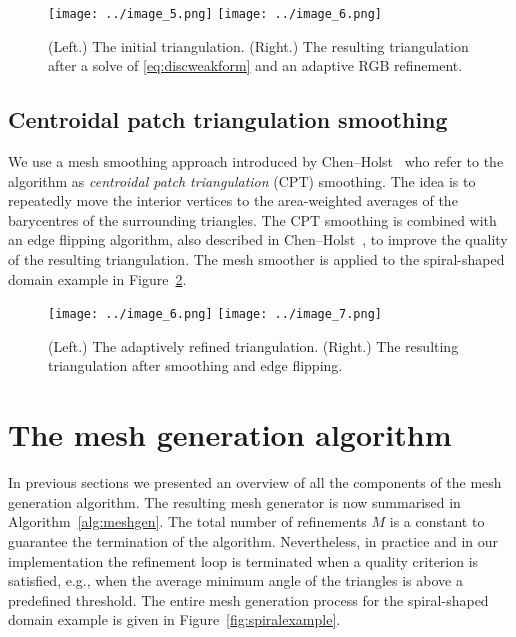 \documentclass[12pt]{rmstyle}
\begin{document}
\begin{figure}[htbp]
\centering
\texttt{[image: ../image\_5.png]}
\texttt{[image: ../image\_6.png]}
\caption{(Left.) The initial triangulation. (Right.) The resulting triangulation
  after a solve of \eqref{eq:discweakform} and an adaptive RGB refinement.}
\label{fig:firstrgb}
\end{figure}

\subsection{Centroidal patch triangulation smoothing}
\label{sec:cpt}

We use a mesh smoothing approach introduced by Chen--Holst~\cite{Chen_2011} who
refer to the algorithm as \emph{centroidal patch triangulation} (CPT) smoothing.
The idea is to repeatedly move the interior vertices to the area-weighted
averages of the barycentres of the surrounding triangles.  The CPT smoothing is
combined with an edge flipping algorithm, also described in
Chen--Holst~\cite{Chen_2011}, to improve the quality of the resulting
triangulation.  The mesh smoother is applied to the spiral-shaped domain example 
in Figure~\ref{fig:firstsmooth}.

\begin{figure}[htbp]
\centering
\texttt{[image: ../image\_6.png]}
\texttt{[image: ../image\_7.png]}
\caption{(Left.) The adaptively refined triangulation. (Right.) The resulting
  triangulation after smoothing and edge flipping.}
\label{fig:firstsmooth}
\end{figure}

\section{The mesh generation algorithm}
\label{sec:orgff9b6c1}

In previous sections we presented an overview of all the components of the mesh
generation algorithm.  The resulting mesh generator is now summarised in
Algorithm~\ref{alg:meshgen}.  The total number of refinements $M$ is a constant
to guarantee the termination of the algorithm.  Nevertheless, in
practice and in our implementation the refinement loop is terminated when a
quality criterion is satisfied, e.g., when the average minimum angle of the
triangles is above a predefined threshold.  The entire mesh generation process
for the spiral-shaped domain example is given in Figure~\ref{fig:spiralexample}.
\end{document}
